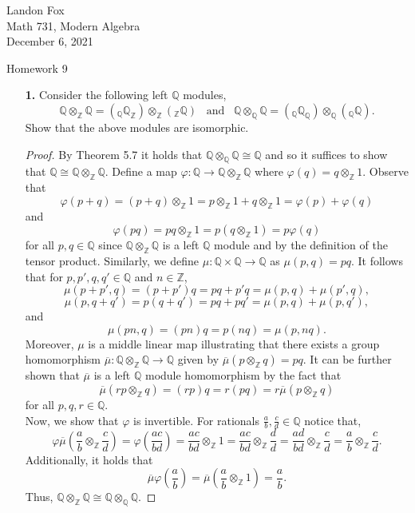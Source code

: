 \documentclass[ 12pt ]{article}
\begin{document}
\noindent Landon Fox \\
\noindent Math 731, Modern Algebra \\
\noindent December 6, 2021

\begin{center}
\Large Homework 9
\end{center}

\begin{enumerate}
	\item[\textbf{1.}] Consider the following left $\mathbb{Q}$ modules, $$\mathbb{Q} \otimes_\mathbb{Z} \mathbb{Q} = (_\mathbb{Q} \mathbb{Q}_\mathbb{Z}) \otimes_\mathbb{Z} (_\mathbb{Z} \mathbb{Q})\;\;\; \mathrm{and}\;\;\; \mathbb{Q} \otimes_\mathbb{Q} \mathbb{Q} = (_\mathbb{Q} \mathbb{Q}_\mathbb{Q}) \otimes_\mathbb{Q} (_\mathbb{Q} \mathbb{Q}).$$ Show that the above modules are isomorphic.

		\begin{proof}
			By Theorem 5.7 it holds that $\mathbb{Q} \otimes_\mathbb{Q} \mathbb{Q} \cong \mathbb{Q}$ and so it suffices to show that $\mathbb{Q} \cong \mathbb{Q} \otimes_\mathbb{Z} \mathbb{Q}$. Define a map $\varphi : \mathbb{Q} \to \mathbb{Q} \otimes_\mathbb{Z} \mathbb{Q}$ where $\varphi(q) = q \otimes_\mathbb{Z} 1$. Observe that $$\varphi(p + q) = (p + q) \otimes_\mathbb{Z} 1 = p \otimes_\mathbb{Z} 1 + q \otimes_\mathbb{Z} 1 = \varphi(p) + \varphi(q)$$ and $$\varphi(pq) =pq \otimes_\mathbb{Z} 1 = p(q \otimes_\mathbb{Z} 1) = p \varphi(q)$$ for all $p, q \in \mathbb{Q}$ since $\mathbb{Q} \otimes_\mathbb{Z} \mathbb{Q}$ is a left $\mathbb{Q}$ module and by the definition of the tensor product. Similarly, we define $\mu : \mathbb{Q} \times \mathbb{Q} \to \mathbb{Q}$ as $\mu(p, q) = pq$. It follows that for $p, p', q, q' \in \mathbb{Q}$ and $n \in \mathbb{Z}$, $$\mu(p + p', q) = (p + p') q = pq + p'q = \mu(p, q) + \mu(p', q),$$ $$\mu(p, q + q') = p(q + q') = pq + pq' = \mu(p, q) + \mu(p, q'),$$ and $$\mu(pn, q) = (pn)q = p(nq) = \mu(p, nq).$$ Moreover, $\mu$ is a middle linear map illustrating that there exists a group homomorphism $\overline{\mu} : \mathbb{Q} \otimes_\mathbb{Z} \mathbb{Q} \to \mathbb{Q}$ given by $\overline{\mu}(p \otimes_\mathbb{Z} q) = pq$. It can be further shown that $\overline{\mu}$ is a left $\mathbb{Q}$ module homomorphism by the fact that $$\overline{\mu}(rp \otimes_\mathbb{Z} q) = (rp)q = r(pq) = r \overline{\mu}(p \otimes_\mathbb{Z} q)$$ for all $p, q, r \in \mathbb{Q}$. \\

			Now, we show that $\varphi$ is invertible. For rationals $\frac{a}{b}, \frac{c}{d} \in \mathbb{Q}$ notice that, $$\varphi \overline{\mu} \left ( \frac{a}{b} \otimes_\mathbb{Z} \frac{c}{d} \right ) = \varphi \left ( \frac{ac}{bd} \right ) = \frac{ac}{bd} \otimes_\mathbb{Z} 1 = \frac{ac}{bd} \otimes_\mathbb{Z} \frac{d}{d} = \frac{ad}{bd} \otimes_\mathbb{Z} \frac{c}{d} = \frac{a}{b} \otimes_\mathbb{Z} \frac{c}{d}.$$ Additionally, it holds that $$\overline{\mu} \varphi \left ( \frac{a}{b} \right ) = \overline{\mu} \left ( \frac{a}{b} \otimes_\mathbb{Z} 1 \right ) = \frac{a}{b}.$$ Thus, $\mathbb{Q} \otimes_\mathbb{Z} \mathbb{Q} \cong \mathbb{Q} \otimes_\mathbb{Q} \mathbb{Q}$.
		\end{proof}



\end{enumerate}
\end{document}
